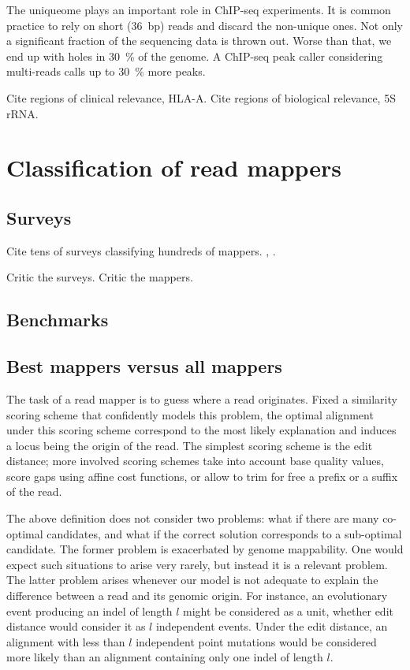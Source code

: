 The uniqueome plays an important role in ChIP-seq experiments.
It is common practice \citep{?} to rely on short (36~bp) reads and discard the non-unique ones.
Not only a significant fraction of the sequencing data is thrown out.
Worse than that, we end up with holes in 30~\% of the genome.
A ChIP-seq peak caller considering multi-reads calls up to 30~\% more peaks.

Cite regions of clinical relevance, \eg HLA-A.
Cite regions of biological relevance, \eg 5S rRNA.



\section{Classification of read mappers}

\subsection{Surveys}

Cite tens of surveys classifying hundreds of mappers.
\citep{Li2010}, \citep{Fonseca2012}.

Critic the surveys.
Critic the mappers.

\subsection{Benchmarks}

\citep{Hatem2013} \citep{Holtgrewe2011}


\subsection{Best mappers versus all mappers}

The task of a read mapper is to guess where a read originates.
Fixed a similarity scoring scheme that confidently models this problem, the optimal alignment under this scoring scheme correspond to the most likely explanation and induces a locus being the origin of the read.
The simplest scoring scheme is the edit distance; more involved scoring schemes take into account base quality values, score gaps using affine cost functions, or allow to trim for free a prefix or a suffix of the read.

The above definition does not consider two problems: what if there are many co-optimal candidates, and what if the correct solution corresponds to a sub-optimal candidate.
The former problem is exacerbated by genome mappability.
One would expect such situations to arise very rarely, but instead it is a relevant problem.
The latter problem arises whenever our model is not adequate to explain the difference between a read and its genomic origin.
For instance, an evolutionary event producing an indel of length $l$ might be considered as a unit, whether edit distance would consider it as $l$ independent events.
Under the edit distance, an alignment with less than $l$ independent point mutations would be considered more likely than an alignment containing only one indel of length $l$.

